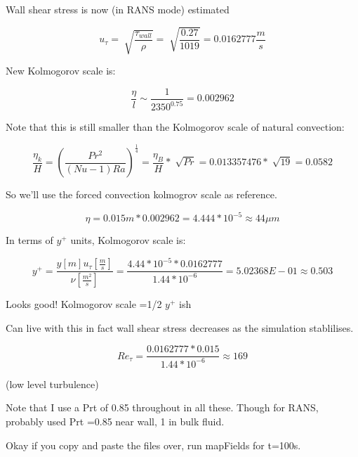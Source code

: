 \documentclass[12pt]{article}
\renewcommand{\_}{\kern-1.5pt\textunderscore\kern-1.5pt}
\begin{document}
 Wall shear stress is now (in RANS mode)  estimated\par

 \[ u_{ \tau}=\sqrt[]{\frac{ \tau_{wall}}{ \rho }}=\sqrt[]{\frac{0.27}{1019}}=0.0162777\frac{m}{s} \] \par

New Kolmogorov scale is:\par

 \[ \frac{ \eta }{l} \sim \frac{1}{2350^{0.75}}=0.002962 \] \par

Note that this is still smaller than the Kolmogorov scale of natural convection:\par

 \[ \frac{ \eta _{k}}{H}= \left( \frac{Pr^{2}}{ \left( Nu-1 \right) Ra} \right) ^{\frac{1}{4}}=\frac{ \eta _{B}}{H}\ast\sqrt[]{Pr}=0.013357476\ast\sqrt[]{19}=0.0582 \] \par

So we’ll use the forced convection kolmogrov scale as reference.\par

 \[  \eta =0.015m\ast0.002962=4.444\ast10^{-5} \approx 44 \mu m \] \par

In terms of  \( y^{+} \)  units, Kolmogorov scale is:\par

 \[ y^{+}=\frac{y \left[ m \right] u_{ \tau} \left[ \frac{m}{s} \right] }{ \nu  \left[ \frac{m^{2}}{s} \right] }=\frac{4.44\ast10^{-5}\ast0.0162777}{1.44\ast10^{-6}}=5.02368E-01 \approx 0.503 \] \par

Looks good! Kolmogorov scale =1/2  \( y^{+} \)  ish\par

Can live with this  in fact wall shear stress decreases as the simulation stablilises.\par

 \[ Re_{ \tau}=\frac{0.0162777\ast0.015}{1.44\ast10^{-6}} \approx 169 \] \par

(low level turbulence)\par

Note that I use a Prt of 0.85 throughout in all these. Though for RANS, probably used Prt =0.85 near wall, 1 in bulk fluid.\par


\vspace{\baselineskip}
Okay if you copy and paste the files over, run mapFields for t=100s.\par
\end{document}
